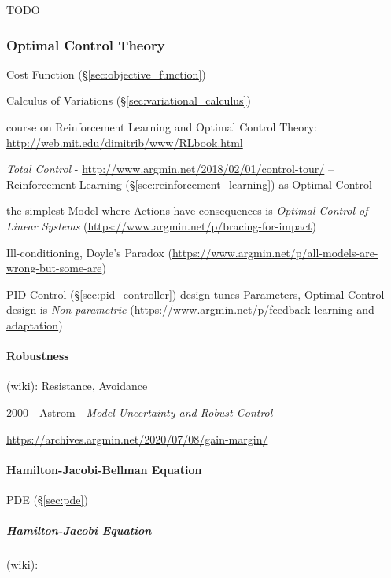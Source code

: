 TODO



\subsubsection{Optimal Control Theory}\label{sec:optimal_control}

Cost Function (\S\ref{sec:objective_function})

\fist Calculus of Variations (\S\ref{sec:variational_calculus})

course on Reinforcement Learning and Optimal Control Theory:
\url{http://web.mit.edu/dimitrib/www/RLbook.html}

\emph{Total Control} - \url{http://www.argmin.net/2018/02/01/control-tour/} --
Reinforcement Learning (\S\ref{sec:reinforcement_learning}) as Optimal Control

the simplest Model where Actions have consequences is \emph{Optimal Control of
Linear Systems} (\url{https://www.argmin.net/p/bracing-for-impact})

Ill-conditioning, Doyle's Paradox
(\url{https://www.argmin.net/p/all-models-are-wrong-but-some-are})

PID Control (\S\ref{sec:pid_controller}) design tunes Parameters, Optimal
Control design is \emph{Non-parametric}
(\url{https://www.argmin.net/p/feedback-learning-and-adaptation})



\paragraph{Robustness}\label{sec:robustness}\hfill

(wiki): Resistance, Avoidance

2000 - Astrom - \emph{Model Uncertainty and Robust Control}

\url{https://archives.argmin.net/2020/07/08/gain-margin/}



\paragraph{Hamilton-Jacobi-Bellman Equation}
\label{sec:hamilton_jacobi_bellman}\hfill

PDE (\S\ref{sec:pde})



\subparagraph{Hamilton-Jacobi Equation}\label{sec:hamilton_jacobi}\hfill

(wiki):


